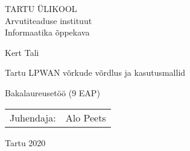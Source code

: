 \documentclass[12pt]{article}
\newcommand{\TODO}{\todo[inline]}
\begin{document}
\thispagestyle{empty}
\begin{center}


\large
TARTU ÜLIKOOL\\
Arvutiteaduse instituut\\
Informaatika õppekava\\[2mm]


\vspace{25mm}

\Large Kert Tali

\vspace{4mm}

\huge Tartu LPWAN võrkude võrdlus ja kasutusmallid

\vspace{20mm}

\Large Bakalaureusetöö (9 EAP)

\end{center}

\vspace{2mm}

\begin{flushright}
 {
 \setlength{\extrarowheight}{5pt}
 \begin{tabular}{r l} 
  \sffamily Juhendaja: & \sffamily Alo Peets \\
 \end{tabular}
 }
\end{flushright}

\vspace{10mm}

\vfill
\centerline{Tartu 2020}




\newpage

\newcommand\EngInfo{{%
\selectlanguage{english}
\noindent\textbf{\large Comparison and use cases of LPWAN networks in Tartu}
\vspace*{1ex}

\noindent\textbf{Abstract:}
\TODO{Valmib lõpus}
\noindent

\vspace*{1ex}

\noindent\textbf{Keywords:}\\
IoT, LPWAN, LoRaWAN, Sigfox, NB-IoT, service comparison, use cases

\vspace*{1ex}

\noindent\textbf{CERCS:} T180 Telecommunication engineering; P170 Computer science, numerical analysis, systems, control

\vspace*{1ex}
}}%
\end{document}
